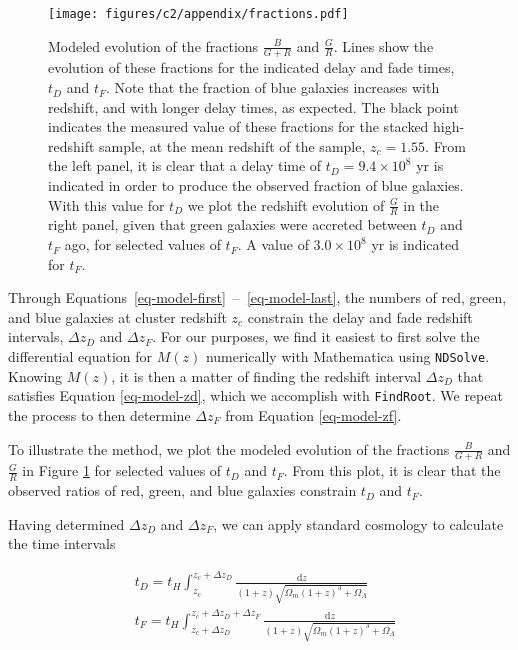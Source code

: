 \begin{figure}
\centering \texttt{[image: figures/c2/appendix/fractions.pdf]}
\caption[Evolution of passive fraction within the quenching model]{Modeled evolution of the fractions $\frac{B}{G+R}$ and $\frac{G}{R}$.
Lines show the evolution of these fractions for the indicated delay and fade times, $t_D$ and $t_F$.
Note that the fraction of blue galaxies increases with redshift, and with longer delay times, as expected.
The black point indicates the measured value of these fractions for the stacked high-redshift sample, at the mean redshift of the sample, $z_c = 1.55$.
From the left panel, it is clear that a delay time of $t_D = 9.4\times10^8$ yr is indicated in order to produce the observed fraction of blue galaxies.
With this value for $t_D$ we plot the redshift evolution of $\frac{G}{R}$ in the right panel, given that green galaxies were accreted between $t_D$ and $t_F$ ago, for selected values of $t_F$.
A value of $3.0\times10^8$ yr is indicated for $t_F$.
\label{fig-frac}}
\end{figure}

Through Equations~\eqref{eq-model-first}~--~\eqref{eq-model-last}, the numbers of red, green, and blue galaxies at cluster redshift $z_c$ constrain the delay and fade redshift intervals, $\Delta z_D$ and $\Delta z_F$.
For our purposes, we find it easiest to first solve the differential equation for $M(z)$ numerically with Mathematica using \texttt{NDSolve}.
Knowing $M(z)$, it is then a matter of finding the redshift interval $\Delta z_D$ that satisfies Equation \ref{eq-model-zd}, which we accomplish with \texttt{FindRoot}.
We repeat the process to then determine $\Delta z_F$ from Equation \ref{eq-model-zf}.

To illustrate the method, we plot the modeled evolution of the fractions $\frac{B}{G+R}$ and $\frac{G}{R}$ in Figure \ref{fig-frac} for selected values of $t_D$ and $t_F$.
From this plot, it is clear that the observed ratios of red, green, and blue galaxies constrain $t_D$ and $t_F$.

Having determined $\Delta z_D$ and $\Delta z_F$, we can apply standard cosmology to calculate the time intervals

\begin{align*}
&t_D = t_H \int_{z_c}^{z_c+\Delta z_D}\frac{\mathrm{d}z}{(1+z)\sqrt{\Omega_m(1+z)^3 + \Omega_\Lambda}}\\
&t_F = t_H \int_{z_c+\Delta z_D}^{z_c+\Delta z_D+\Delta z_F}\frac{\mathrm{d}z}{(1+z)\sqrt{\Omega_m(1+z)^3 + \Omega_\Lambda}}
\end{align*}

